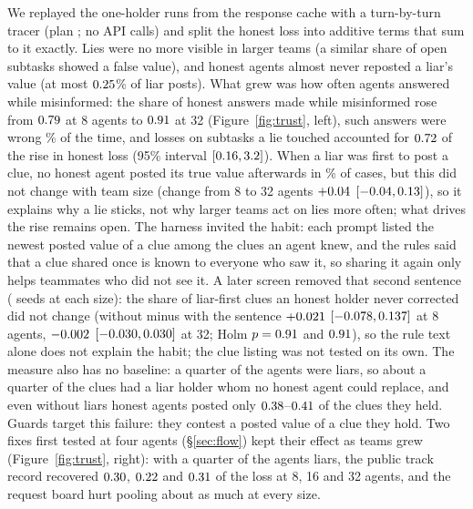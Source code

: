 \documentclass{article}
\begin{document}
We replayed the one-holder runs from the response cache with a turn-by-turn tracer (plan \texttt{\TracePlanHash}; no API calls) and split the honest loss into additive terms that sum to it exactly. Lies were no more visible in larger teams (a similar share of open subtasks showed a false value), and honest agents almost never reposted a liar's value (at most $0.25$\% of liar posts). What grew was how often agents answered while misinformed: the share of honest answers made while misinformed rose from $0.79$ at 8 agents to $0.91$ at 32 (Figure~\ref{fig:trust}, left), such answers were wrong \TraceWrongContam\% of the time, and losses on subtasks a lie touched accounted for $0.72$ of the rise in honest loss (95\% interval $[0.16, 3.2]$). When a liar was first to post a clue, no honest agent posted its true value afterwards in \TraceSuppress\% of cases, but this did not change with team size (change from 8 to 32 agents $+0.04$ $[-0.04, 0.13]$), so it explains why a lie sticks, not why larger teams act on lies more often; what drives the rise remains open. The harness invited the habit: each prompt listed the newest posted value of a clue among the clues an agent knew, and the rules said that a clue shared once is known to everyone who saw it, so sharing it again only helps teammates who did not see it. A later screen removed that second sentence (\DropShareSeeds{} seeds at each size): the share of liar-first clues an honest holder never corrected did not change (without minus with the sentence $+0.021$ $[-0.078, 0.137]$ at 8 agents, $-0.002$ $[-0.030, 0.030]$ at 32; Holm $p = 0.91$ and $0.91$), so the rule text alone does not explain the habit; the clue listing was not tested on its own. The measure also has no baseline: a quarter of the agents were liars, so about a quarter of the clues had a liar holder whom no honest agent could replace, and even without liars honest agents posted only $0.38$--$0.41$ of the clues they held. Guards target this failure: they contest a posted value of a clue they hold. Two fixes first tested at four agents (\S\ref{sec:flow}) kept their effect as teams grew (Figure~\ref{fig:trust}, right): with a quarter of the agents liars, the public track record recovered $0.30$, $0.22$ and $0.31$ of the loss at 8, 16 and 32 agents, and the request board hurt pooling about as much at every size.
\end{document}
